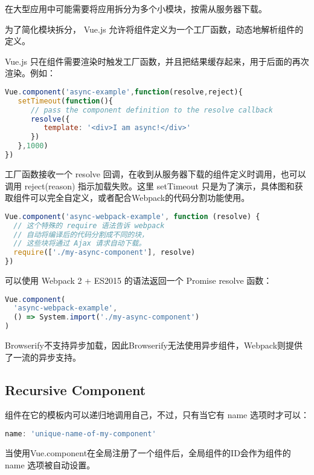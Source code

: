 在大型应用中可能需要将应用拆分为多个小模块，按需从服务器下载。

为了简化模块拆分， Vue.js 允许将组件定义为一个工厂函数，动态地解析组件的定义。

Vue.js 只在组件需要渲染时触发工厂函数，并且把结果缓存起来，用于后面的再次渲染。例如：

\begin{lstlisting}[language=JavaScript]
Vue.component('async-example',function(resolve,reject){
   setTimeout(function(){
      // pass the component definition to the resolve callback
      resolve({
         template: '<div>I am async!</div>'
      })
   },1000)
})
\end{lstlisting}

工厂函数接收一个 resolve 回调，在收到从服务器下载的组件定义时调用，也可以调用 reject(reason) 指示加载失败。这里 setTimeout 只是为了演示，具体图和获取组件可以完全自定义，或者配合Webpack的代码分割功能使用。



\begin{lstlisting}[language=JavaScript]
Vue.component('async-webpack-example', function (resolve) {
  // 这个特殊的 require 语法告诉 webpack
  // 自动将编译后的代码分割成不同的块，
  // 这些块将通过 Ajax 请求自动下载。
  require(['./my-async-component'], resolve)
})
\end{lstlisting}

可以使用 Webpack 2 + ES2015 的语法返回一个 Promise resolve 函数：


\begin{lstlisting}[language=JavaScript]
Vue.component(
  'async-webpack-example',
  () => System.import('./my-async-component')
)
\end{lstlisting}

Browserify不支持异步加载，因此Browserify无法使用异步组件，Webpack则提供了一流的异步支持。

\subsection{Recursive Component}

组件在它的模板内可以递归地调用自己，不过，只有当它有 name 选项时才可以：

\begin{lstlisting}[language=JavaScript]
name: 'unique-name-of-my-component'
\end{lstlisting}

当使用Vue.component在全局注册了一个组件后，全局组件的ID会作为组件的 name 选项被自动设置。



